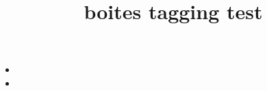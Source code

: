 \documentclass{article}
\title{boites tagging test}
\begin{document}
\begin{breakbox}
\begin{itemize}
\item \kant[1]
\item \kant[2]
\end{itemize}
\end{breakbox}

\bkcounttrue
\begin{breakbox}
\kant[1]
\end{breakbox}
\end{document}
